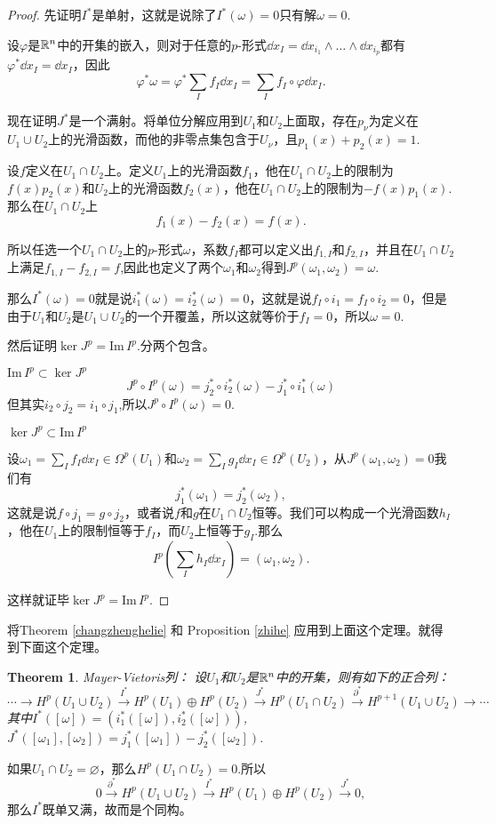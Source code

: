 \documentclass[8pt]{book}
\theoremstyle{plain}%
\newtheorem{theo}{Theorem}[section]%
\begin{document}
\begin{proof}
先证明$I^*$是单射，这就是说除了$I^*(\omega)=0$只有解$\omega=0$.

设$\varphi$是$\mathbb{R}^n$中的开集的嵌入，则对于任意的$p$-形式$\dd x_I=\dd x_{i_1}\wedge\dots\wedge\dd x_{i_p}$都有$\varphi^* \dd x_I =\dd x_I$，因此
\[
\varphi^*\omega=\varphi^*\sum_If_I\dd x_I=\sum_If_I\circ\varphi \dd x_I.
\]

现在证明$J^*$是一个满射。将单位分解应用到$U_1$和$U_2$上面取，存在$p_\nu$为定义在$U_1\cup U_2$上的光滑函数，而他的非零点集包含于$U_\nu$，且$p_1(x)+p_2(x)=1$.

设$f$定义在$U_1\cap U_2$上。定义$U_1$上的光滑函数$f_1$，他在$U_1\cap U_2$上的限制为$f(x)p_2(x)$和$U_2$上的光滑函数$f_2(x)$，他在$U_1\cap U_2$上的限制为$-f(x)p_1(x)$.那么在$U_1\cap U_2$上
\[
f_1(x)-f_2(x)=f(x).
\]

所以任选一个$U_1\cap U_2$上的$p$-形式$\omega$，系数$f_I$都可以定义出$f_{1,I}$和$f_{2,I}$，并且在$U_1\cap U_2$上满足$f_{1,I}-f_{2,I}=f$,因此也定义了两个$\omega_1$和$\omega_2$得到$J^p(\omega_1,\omega_2)=\omega$.

那么$I^*(\omega)=0$就是说$i_1^*(\omega)=i_2^*(\omega)=0$，这就是说$f_I\circ i_1=f_I\circ i_2=0$，但是由于$U_1$和$U_2$是$U_1\cup U_2$的一个开覆盖，所以这就等价于$f_I=0$，所以$\omega=0$.

然后证明$\ker J^p=\mathrm{Im}\, I^p$.分两个包含。

 $\mathrm{Im}\, I^p\subset \ker J^p$
\[
J^p\circ I^p(\omega)=j_2^*\circ i_2^*(\omega)-j_1^*\circ i_1^*(\omega)
\]
但其实$i_2\circ j_2=i_1\circ j_1$,所以$J^p\circ I^p(\omega)=0$.

 $\ker J^p\subset \mathrm{Im}\, I^p$

设$\omega_1=\sum_I f_I \dd x_I\in \Omega^p(U_1)$和$\omega_2=\sum_I g_I \dd x_I\in \Omega^p(U_2)$，从$J^p(\omega_1,\omega_2)=0$我们有
\[
j_1^*(\omega_1)=j_2^*(\omega_2),
\]
这就是说$f\circ j_1=g\circ j_2$，或者说$f$和$g$在$U_1\cap U_2$恒等。我们可以构成一个光滑函数$h_I$，他在$U_1$上的限制恒等于$f_I$，而$U_2$上恒等于$g_I$.那么
\[
I^p\left(\sum_Ih_I\dd x_I\right)=(\omega_1,\omega_2).
\]

这样就证毕$\ker J^p=\mathrm{Im}\, I^p$.
\end{proof}
将Theorem \ref{changzhenghelie} 和 Proposition \ref{zhihe} 应用到上面这个定理。就得到下面这个定理。
\begin{theo}Mayer-Vietoris列：
设$U_1$和$U_2$是$\mathbb{R}^n$中的开集，则有如下的正合列：
\[
\cdots\to H^p(U_1\cup U_2)\xrightarrow{I^*}H^p(U_1)\oplus H^p(U_2)\xrightarrow{J^*}H^p(U_1\cap U_2)\xrightarrow{\partial^*}H^{p+1}(U_1\cup U_2)
\to \cdots
\]
其中$I^*([\omega])=(i_1^*([\omega]),i_2^*([\omega]))$,$J^*([\omega_1],[\omega_2])=j_1^*([\omega_1])-j_2^*([\omega_2])$.
\end{theo}
如果$U_1\cap U_2=\varnothing$，那么$H^p(U_1\cap U_2)=0$.所以
\[
0\xrightarrow{\partial^*} H^p(U_1\cup U_2)\xrightarrow{I^*}H^p(U_1)\oplus H^p(U_2)\xrightarrow{J^*}0,
\]
那么$I^*$既单又满，故而是个同构。
\end{document}
